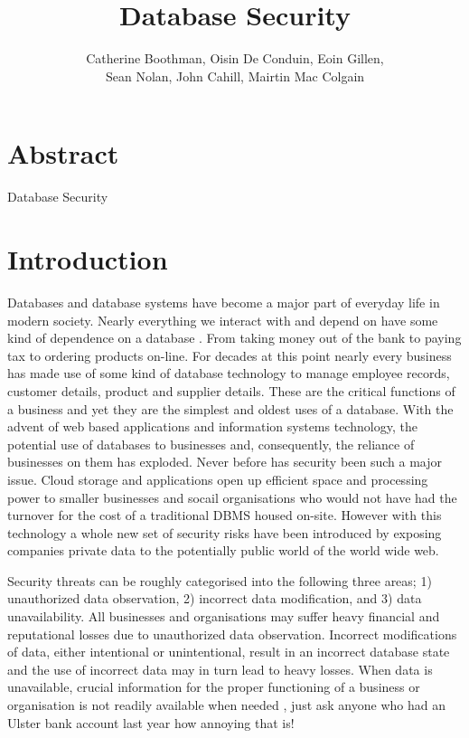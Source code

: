 \documentclass[11pt]{article}
\title{Database Security}
\author{Catherine Boothman, Oisin De Conduin, Eoin Gillen, \\
Sean Nolan, John Cahill, Mairtin Mac Colgain}
\begin{document}
\marginsize{25mm}{25mm}{25mm}{25mm}     %

\maketitle

\section{Abstract}
Database Security

\section{Introduction}
Databases and database systems have become a major part of everyday life in modern society.  Nearly everything we interact with and depend on have some kind of dependence on a database \cite{ElmNav}.  From taking money out of the bank to paying tax to ordering products on-line.  For decades at this point nearly every business has made use of some kind of database technology to manage employee records, customer details, product and supplier details.  These are the critical functions of a business and yet they are the simplest and oldest uses of a database.  With the advent of web based applications and information systems technology, the potential use of databases to businesses and, consequently, the reliance of businesses on them has exploded.  Never before has security been such a major issue.  Cloud storage and applications open up efficient space and processing power to smaller businesses and socail organisations who would not have had the turnover for the cost of a traditional DBMS housed on-site.  However with this technology a whole new set of security risks have been introduced by exposing companies private data to the potentially public world of the world wide web.  

Security threats can be roughly categorised into the following three areas; 1) unauthorized data observation, 2) incorrect data modification, and 3) data unavailability.  All businesses and organisations may suffer heavy financial and reputational losses due to unauthorized data observation. Incorrect modifications of data, either intentional or unintentional, result in an incorrect database state and the use of incorrect data may in turn lead to heavy losses.  When data is unavailable, crucial information for the proper functioning of a business or organisation is not readily available when needed \cite{BerSand}, just ask anyone who had an Ulster bank account last year how annoying that is!  
\end{document}

